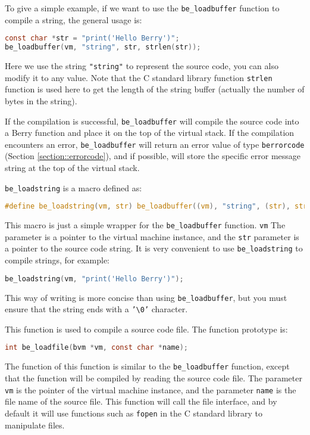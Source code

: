 To give a simple example, if we want to use the \texttt{be\_loadbuffer} function to compile a string, the general usage is:
\begin{lstlisting}[language=c, style=berry, numbers=none]
const char *str = "print('Hello Berry')";
be_loadbuffer(vm, "string", str, strlen(str));
\end{lstlisting}
Here we use the string \texttt{"string"} to represent the source code, you can also modify it to any value. Note that the C standard library function \texttt{strlen} function is used here to get the length of the string buffer (actually the number of bytes in the string).

If the compilation is successful, \texttt{be\_loadbuffer} will compile the source code into a Berry function and place it on the top of the virtual stack. If the compilation encounters an error, \texttt{be\_loadbuffer} will return an error value of type \texttt{berrorcode} (Section \ref{section::errorcode}), and if possible, will store the specific error message string at the top of the virtual stack.


\texttt{be\_loadstring} is a macro defined as:
\begin{lstlisting}[language=c, style=berry, numbers=none]
#define be_loadstring(vm, str) be_loadbuffer((vm), "string", (str), strlen(str))
\end{lstlisting}
This macro is just a simple wrapper for the \texttt{be\_loadbuffer} function. \texttt{vm} The parameter is a pointer to the virtual machine instance, and the \texttt{str} parameter is a pointer to the source code string. It is very convenient to use \texttt{be\_loadstring} to compile strings, for example:
\begin{lstlisting}[language=c, style=berry, numbers=none]
be_loadstring(vm, "print('Hello Berry')");
\end{lstlisting}
This way of writing is more concise than using \texttt{be\_loadbuffer}, but you must ensure that the string ends with a \texttt{'\textbackslash 0'} character.


This function is used to compile a source code file. The function prototype is:
\begin{lstlisting}[language=c, style=berry, numbers=none]
int be_loadfile(bvm *vm, const char *name);
\end{lstlisting}
The function of this function is similar to the \texttt{be\_loadbuffer} function, except that the function will be compiled by reading the source code file. The parameter \texttt{vm} is the pointer of the virtual machine instance, and the parameter \texttt{name} is the file name of the source file. This function will call the file interface, and by default it will use functions such as \texttt{fopen} in the C standard library to manipulate files.

